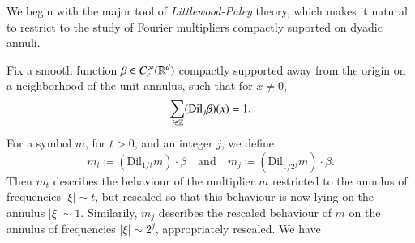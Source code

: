 We begin with the major tool of \emph{Littlewood-Paley} theory, which makes it natural to restrict to the study of Fourier multipliers compactly suported on dyadic annuli.
\begin{comment}
    We can therefore introduce the Littlewood-Paley projection operators $P_j$, which are Fourier multipliers with symbol $\text{Dil}_{2^j} \phi$. Littlewood-Paley theory guarantees that for $1 < r < \infty$,
%
\[ \| f \|_{L^r(\RR^d)} \sim_r \left( \sum_n \| P_n f \|_{L^r(\RR^d)}^2 \right)^{1/2}. \]
%
We also must introduce a slightly thickened function $\tilde{\phi} \in C_c^\infty(\RR^d)$ supported on $\{ \xi \in \RR^d: 1/4 \leq |\xi| \leq 4 \}$, equal to one on the support of $\phi$, and with $1 = \sum_j \text{Dil}_{2^j} \tilde{\phi}$, then we can introuce the Littlewood-Paley projections $\tilde{P}_j$ with symbol $\text{Dil}_{2^j} \tilde{\phi}$. For $1 < q < \infty$, we thus have
%
\[ \| m(D) f \|_{L^q(\RR^d)} \sim_q \left( \sum_j \| P_j m(D) f \|_{L^q(\RR^d)}^2 \right)^{1/2} = \left( \| P_j m(D) \{ \tilde{P}_j f \} \|_{L^q(\RR^d)}^2 \right)^{1/2}. \]
%
Now
%
\[ P_j m(D) \{ \tilde{P}_j f \} = \text{Dil}_{1/2^j} \{ m_{2^j}(D) \circ \text{Dil}_{2^j} \{ \tilde{P}_j f \} \}, \]
%
and so
%
\[ \| P_j m(D) \{ \tilde{P}_j f \} \|_{L^q(\RR^d)} = 2^{-jd/q} \| m_{2^j}(D) \text{Dil}_{2^j} \{ \tilde{P}_j f \} \|_{L^q(\RR^d)}. \]
%
We thus have
%
\begin{align*}
    \| m(D) f \|_{L^q(\RR^d)} &\lesssim_q \left( \sum_j 4^{jd(1/p - 1/q)} \| m_{2^j} \|_{M^{p,q}(\RR^d)}^2 \| \tilde{P}_j f \|_{L^p(\RR^d)}^2 \right)^{1/2}\\
    &\leq \left( \sup_t t^{d(1/p - 1/q)} \| m_t \|_{M^{p,q}(\RR^d)} \right) \left( \sum_j \| \tilde{P}_j f \|_{L^p(\RR^d)}^2 \right)^{1/2}\\
    &\sim_p \left( \sup_t t^{d(1/p - 1/q)} \| m_t \|_{M^{p,q}(\RR^d)} \right) \| f \|_{L^p(\RR^d)}.
\end{align*}
%
Moreover, this inequality is tight.
\end{comment}
Fix a smooth function $\beta \in C_c^\infty(\operatorname{\mathbb{R}}^d)$ compactly supported away from the origin on a neighborhood of the unit annulus, such that for $x \neq 0$,
%
\[ \sum_{j \in \operatorname{\mathbb{Z}}} (\text{Dil}_j \beta)(x) = 1. \]
%
For a symbol $m$, for $t > 0$, and an integer $j$, we define
%
\[ m_t \coloneqq (\text{Dil}_{1/t} m) \cdot \beta \quad\text{and}\quad m_j \coloneqq (\text{Dil}_{1/2^j} m) \cdot \beta. \]
%
Then $m_t$ describes the behaviour of the multiplier $m$ restricted to the annulus of frequencies $|\xi| \sim t$, but rescaled so that this behaviour is now lying on the annulus $|\xi| \sim 1$. Similarily, $m_j$ describes the rescaled behaviour of $m$ on the annulus of frequencies $|\xi| \sim 2^j$, appropriately rescaled. We have
